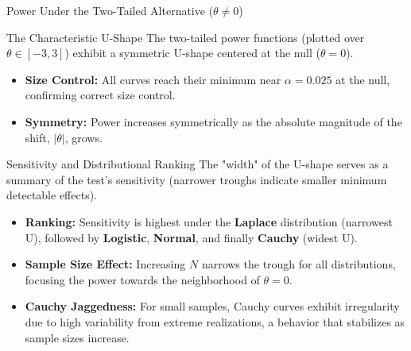 \documentclass[8pt]{beamer}
\begin{document}
\begin{frame}{Power Under the Two-Tailed Alternative ($\theta \neq 0$)}
    \footnotesize
    \begin{block}{The Characteristic U-Shape}
        The two-tailed power functions (plotted over $\theta \in [-3, 3]$) exhibit a symmetric U-shape centered at the null ($\theta = 0$).
        \begin{itemize}
            \item \textbf{Size Control:} All curves reach their minimum near $\alpha = 0.025$ at the null, confirming correct size control.
            \item \textbf{Symmetry:} Power increases symmetrically as the absolute magnitude of the shift, $|\theta|$, grows.
        \end{itemize}
    \end{block}

    \begin{block}{Sensitivity and Distributional Ranking}
        The "width" of the U-shape serves as a summary of the test's sensitivity (narrower troughs indicate smaller minimum detectable effects).
        \begin{itemize}
            \item \textbf{Ranking:} Sensitivity is highest under the \textbf{Laplace} distribution (narrowest U), followed by \textbf{Logistic}, \textbf{Normal}, and finally \textbf{Cauchy} (widest U).
            \item \textbf{Sample Size Effect:} Increasing $N$ narrows the trough for all distributions, focusing the power towards the neighborhood of $\theta = 0$.
            \item \textbf{Cauchy Jaggedness:} For small samples, Cauchy curves exhibit irregularity due to high variability from extreme realizations, a behavior that stabilizes as sample sizes increase.
        \end{itemize}
    \end{block}
\end{frame}
\end{document}

